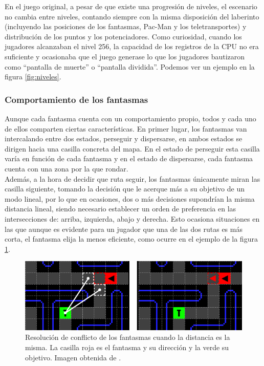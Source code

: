 En el juego original, a pesar de que existe una progresión de niveles, el escenario no cambia entre niveles, contando siempre con la misma disposición del laberinto (incluyendo las posiciones de los fantasmas, Pac-Man y los teletransportes) y distribución de los puntos y los potenciadores. Como curiosidad, cuando los jugadores alcanzaban el nivel 256, la capacidad de los registros de la CPU no era suficiente y ocasionaba que el juego generase lo que los jugadores bautizaron como ``pantalla de muerte'' o ``pantalla dividida''. Podemos ver un ejemplo en la figura \ref{fig:niveles}.

\subsubsection{Comportamiento de los fantasmas}

Aunque cada fantasma cuenta con un comportamiento propio, todos y cada uno de ellos comparten ciertas características. En primer lugar, los fantasmas van intercalando entre dos estados, perseguir y dispersarse, en ambos estados se dirigen hacia una casilla concreta del mapa. En el estado de perseguir esta casilla varía en función de cada fantasma y en el estado de dispersarse, cada fantasma cuenta con una zona por la que rondar.\\

Además, a la hora de decidir que ruta seguir, los fantasmas únicamente miran las casilla siguiente, tomando la decisión que le acerque más a su objetivo de un modo lineal, por lo que en ocasiones, dos o más decisiones supondrían la misma distancia lineal, siendo necesario establecer un orden de preferencia en las intersecciones de: arriba, izquierda, abajo y derecha. Esto ocasiona situaciones en las que aunque es evidente para un jugador que una de las dos rutas es más corta, el fantasma elija la menos eficiente, como ocurre en el ejemplo de la figura \ref{fig:decidir}.

\begin{figure}[H]
    \begin{center}
        \includegraphics[scale=0.5,]{img/TieBreak.png}
        \caption{Resolución de conflicto de los fantasmas cuando la distancia es la misma. La casilla roja es el fantasma y su dirección y la verde su objetivo. Imagen obtenida de \cite{pittman2015}.}
        \label{fig:decidir}
    \end{center}
\end{figure}

